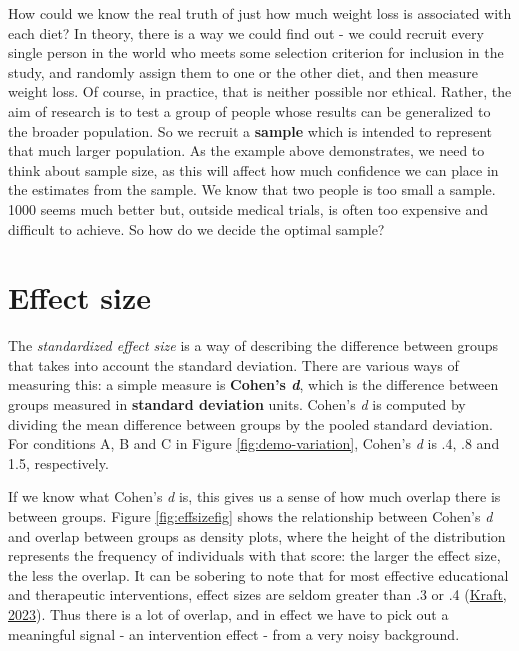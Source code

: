 \documentclass{krantz}
\begin{document}
How could we know the real truth of just how much weight loss is associated with each diet? In theory, there is a way we could find out - we could recruit every single person in the world who meets some selection criterion for inclusion in the study, and randomly assign them to one or the other diet, and then measure weight loss. Of course, in practice, that is neither possible nor ethical. Rather, the aim of research is to test a group of people whose results can be generalized to the broader population. So we recruit a \textbf{sample} which is intended to represent that much larger population. As the example above demonstrates, we need to think about sample size, as this will affect how much confidence we can place in the estimates from the sample. We know that two people is too small a sample. 1000 seems much better but, outside medical trials, is often too expensive and difficult to achieve. So how do we decide the optimal sample?

\hypertarget{effect-size}{%
\section{Effect size}\label{effect-size}}

The \emph{standardized effect size}  is a way of describing the difference between groups that takes into account the standard deviation. There are various ways of measuring this: a simple measure is \textbf{Cohen's \emph{d}}, which is the difference between groups measured in \textbf{standard deviation} units. Cohen's \emph{d} is computed by dividing the mean difference between groups by the pooled standard deviation. For conditions A, B and C in Figure \ref{fig:demo-variation}, Cohen's \emph{d} is .4, .8 and 1.5, respectively.

If we know what Cohen's \emph{d} is, this gives us a sense of how much overlap there is between groups. Figure \ref{fig:effsizefig} shows the relationship between Cohen's \emph{d} and overlap between groups as density plots, where the height of the distribution represents the frequency of individuals with that score: the larger the effect size, the less the overlap. It can be sobering to note that for most effective educational and therapeutic interventions, effect sizes are seldom greater than .3 or .4 (\protect\hyperlink{ref-kraft2023}{Kraft, 2023}). Thus there is a lot of overlap, and in effect we have to pick out a meaningful signal - an intervention effect - from a very noisy background.
\end{document}
